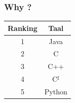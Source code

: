 \begin{frame}
  \frametitle{Why \cpp?}
  \begin{center}
    \begin{tabular}{cc}
      \textbf{Ranking} & \textbf{Taal} \\
      \toprule
      1 & Java \\
      2 & C \\
      3 & C++ \\
      4 & C$^\sharp$ \\
      5 & Python \\
    \end{tabular}
    \vskip5mm
  \end{center}
\end{frame}


